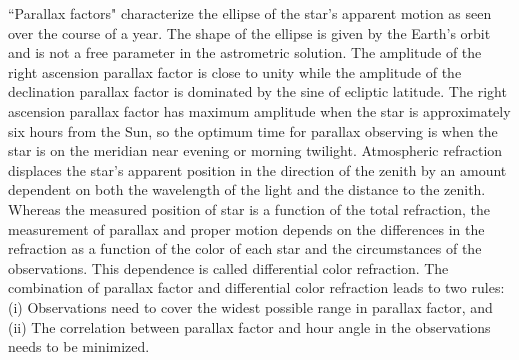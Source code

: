 ``Parallax factors" characterize the ellipse of the star's apparent motion as seen over the course of a year. The shape of the ellipse is given by the Earth's orbit and is not a free parameter in the astrometric solution. The amplitude of the right ascension parallax factor is close to unity while the amplitude of the declination parallax factor is dominated by the sine of ecliptic latitude.
The right ascension parallax factor has maximum amplitude when the star is approximately six hours from the Sun, so the optimum time for parallax observing is when the
star is on the meridian near evening or morning twilight. Atmospheric refraction displaces the star's apparent position in the direction of the zenith by an amount dependent on both the wavelength of the light and the distance to the zenith. Whereas the measured position of star is a function of the total refraction, the measurement of parallax
and proper motion depends on the differences in the refraction as a function of the color of each star and the circumstances of the observations.  This
dependence is called differential color refraction. The combination of parallax factor and differential color refraction leads to two rules: (i) Observations need to cover the widest possible range in parallax
factor, and (ii) The correlation between parallax factor and hour angle in the observations needs to be minimized.




